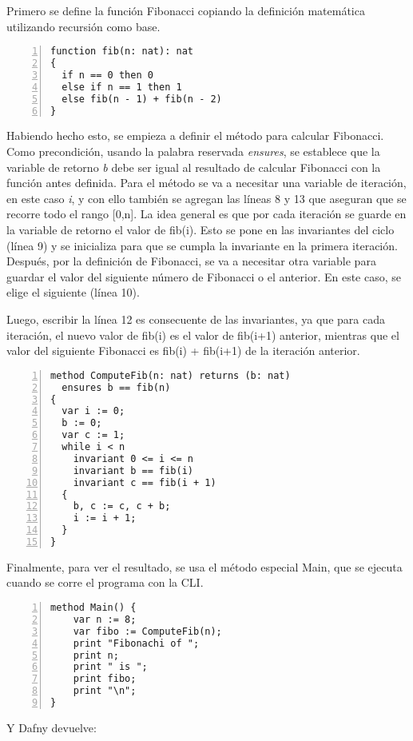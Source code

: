 \documentclass[runningheads]{llncs}
\begin{document}
Primero se define la función Fibonacci copiando la definición matemática utilizando recursión como base.

\begin{Verbatim}[numbers=left,xleftmargin=5mm]
function fib(n: nat): nat
{
  if n == 0 then 0
  else if n == 1 then 1
  else fib(n - 1) + fib(n - 2)
}
\end{Verbatim}

Habiendo hecho esto, se empieza a definir el método para calcular Fibonacci.
Como precondición, usando la palabra reservada \textit{ensures}, se establece que la variable de retorno \textit{b} debe ser igual al resultado de calcular Fibonacci con la función antes definida.
Para el método se va a necesitar una variable de iteración, en este caso \textit{i}, y con ello también se agregan las líneas 8 y 13 que aseguran que se recorre todo el rango [0,n].
La idea general es que por cada iteración se guarde en la variable de retorno el valor de fib(i). Esto se pone en las invariantes del ciclo (línea 9)
y se inicializa para que se cumpla la invariante en la primera iteración. Después, por la definición de Fibonacci, se va a necesitar otra variable para guardar el valor del siguiente número de
Fibonacci o el anterior. En este caso, se elige el siguiente (línea 10).

Luego, escribir la línea 12 es consecuente de las invariantes, ya que para cada iteración, el nuevo valor de fib(i) es el valor de fib(i+1) anterior, mientras que
el valor del siguiente Fibonacci es fib(i) + fib(i+1) de la iteración anterior.

\begin{Verbatim}[numbers=left,xleftmargin=5mm]
method ComputeFib(n: nat) returns (b: nat)
  ensures b == fib(n)
{
  var i := 0;
  b := 0;
  var c := 1;
  while i < n
    invariant 0 <= i <= n
    invariant b == fib(i)
    invariant c == fib(i + 1)
  {
    b, c := c, c + b;
    i := i + 1;
  }
}
\end{Verbatim}

Finalmente, para ver el resultado, se usa el método especial Main, que se ejecuta cuando se corre el programa con la CLI.

\begin{Verbatim}[numbers=left,xleftmargin=5mm]
method Main() {
    var n := 8;
    var fibo := ComputeFib(n);
    print "Fibonachi of ";
    print n;
    print " is ";
    print fibo;
    print "\n";
}
\end{Verbatim}

Y Dafny devuelve:
\end{document}
